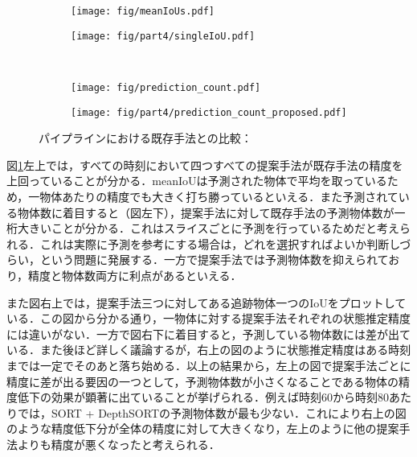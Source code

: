 \begin{figure}[t]
    \begin{subfigure}[t]{0.5\linewidth}
        \centering
        \texttt{[image: fig/meanIoUs.pdf]}
    \end{subfigure}
    \hfill
    \begin{subfigure}[t]{.5\linewidth}
        \centering
        \texttt{[image: fig/part4/singleIoU.pdf]}
    \end{subfigure}
    \\    
    \begin{subfigure}[t]{0.5\linewidth}
        \centering
        \texttt{[image: fig/prediction\_count.pdf]} 
    \end{subfigure}
    \hfill
    \begin{subfigure}[t]{.5\linewidth}
        \centering
        \texttt{[image: fig/part4/prediction\_count\_proposed.pdf]}
    \end{subfigure}
    \vspace{-3zh}
    \caption[パイプラインにおける既存手法との比較]{パイプラインにおける既存手法との比較：}
    \label{fig:pipeline_assessment}
\end{figure}

図\ref{fig:pipeline_assessment}左上では，すべての時刻において四つすべての提案手法が既存手法の精度を上回っていることが分かる．meanIoUは予測された物体で平均を取っているため，一物体あたりの精度でも大きく打ち勝っているといえる．また予測されている物体数に着目すると（図左下），提案手法に対して既存手法の予測物体数が一桁大きいことが分かる．これはスライスごとに予測を行っているためだと考えられる．これは実際に予測を参考にする場合は，どれを選択すればよいか判断しづらい，という問題に発展する．一方で提案手法では予測物体数を抑えられており，精度と物体数両方に利点があるといえる．

また図右上では，提案手法三つに対してある追跡物体一つのIoUをプロットしている．この図から分かる通り，一物体に対する提案手法それぞれの状態推定精度には違いがない．一方で図右下に着目すると，予測している物体数には差が出ている．また後ほど詳しく議論するが，右上の図のように状態推定精度はある時刻までは一定でそのあと落ち始める．以上の結果から，左上の図で提案手法ごとに精度に差が出る要因の一つとして，予測物体数が小さくなることである物体の精度低下の効果が顕著に出ていることが挙げられる．例えば時刻$60$から時刻$80$あたりでは，SORT + DepthSORTの予測物体数が最も少ない．これにより右上の図のような精度低下分が全体の精度に対して大きくなり，左上のように他の提案手法よりも精度が悪くなったと考えられる．

